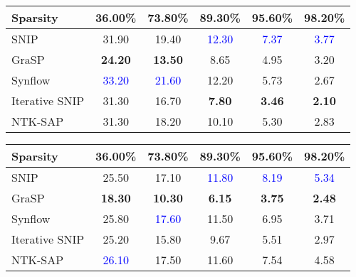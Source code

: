 \begin{table*}
    
    \begin{center}
    \caption{Inference FLOPs ($\times 10^{6}$) comparison on CIFAR-10(ResNet-20). Results with the largest FLOPs are in \textcolor{blue}{blue} and results with the smallest FLOPs are in \textbf{bold}.}     \label{tab:appendix-flops-inf-cifar10}
    {
    \begin{tabular}{l ccccc}
    \\
    \hline
    \toprule
    Sparsity & 36.00\% & 73.80\% & 89.30\% & 95.60\% & 98.20\% \\
    \midrule
    SNIP & 31.90 & 19.40 & \textcolor{blue}{12.30} & \textcolor{blue}{7.37} & \textcolor{blue}{3.77}  \\
    GraSP & \textbf{24.20} & \textbf{13.50} & 8.65 & 4.95 & 3.20 \\
    Synflow & \textcolor{blue}{33.20} & \textcolor{blue}{21.60} & 12.20 & 5.73 & 2.67  \\
    Iterative SNIP & 31.30 & 16.70 & \textbf{7.80} & \textbf{3.46} & \textbf{2.10} \\
    NTK-SAP & 31.30 & 18.20 & 10.10 & 5.30 & 2.83 \\

    \bottomrule
    \end{tabular}
    }
    
    \end{center}
        \begin{center}
    \caption{Inference FLOPs ($\times 10^{7}$) comparison on CIFAR-100(VGG-16). Results with the largest FLOPs are in \textcolor{blue}{blue} and results with the smallest FLOPs are in \textbf{bold}.}     \label{tab:appendix-flops-inf-cifar100}
    {
    \begin{tabular}{l ccccc}
    \\
    \hline
    \toprule
    Sparsity & 36.00\% & 73.80\% & 89.30\% & 95.60\% & 98.20\% \\
    \midrule
    SNIP & 25.50 & 17.10 & \textcolor{blue}{11.80} & \textcolor{blue}{8.19} & \textcolor{blue}{5.34}  \\
    GraSP & \textbf{18.30} & \textbf{10.30} & \textbf{6.15} & \textbf{3.75} & \textbf{2.48} \\
    Synflow & 25.80 & \textcolor{blue}{17.60} & 11.50 & 6.95 & 3.71  \\
    Iterative SNIP & 25.20 & 15.80 & 9.67 & 5.51 & 2.97 \\
    NTK-SAP & \textcolor{blue}{26.10} & 17.50 & 11.60 & 7.54 & 4.58 \\


\end{tabular}}
\end{center}
\end{table*}
